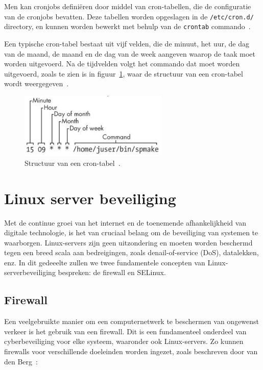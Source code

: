 Men kan cronjobs defini\"eren door middel van cron-tabellen, die de configuratie van de cronjobs bevatten.
Deze tabellen worden opgeslagen in de \texttt{/etc/cron.d/} directory, en kunnen worden bewerkt met behulp van de \texttt{crontab} commando~\autocite{ward2021linux}.

Een typische cron-tabel bestaat uit vijf velden, die de minuut, het uur, de dag van de maand, de maand en de dag van de week aangeven waarop de taak moet worden uitgevoerd.
Na de tijdvelden volgt het commando dat moet worden uitgevoerd, zoals te zien is in figuur~\ref{fig:cronjob-structure}, waar de structuur van een cron-tabel wordt weergegeven~\autocite{ward2021linux}.

\begin{figure}[h!]
    \begin{center}
        \includegraphics[width=200pt]
        {./graphics/linux/cronjob-structure.png}
        \caption{\label{fig:cronjob-structure}Structuur van een cron-tabel~\autocite{ward2021linux}.}
    \end{center}
\end{figure}

\section{Linux server beveiliging}
\label{linux_server_beveiliging}

Met de continue groei van het internet en de toenemende afhankelijkheid van digitale technologie, is het van cruciaal belang om de beveiliging van systemen te waarborgen.
Linux-servers zijn geen uitzondering en moeten worden beschermd tegen een breed scala aan bedreigingen, zoals denail-of-service (DoS), datalekken, enz.
In dit gedeeelte zullen we twee fundamentele concepten van Linux-serverbeveiliging bespreken: de firewall en SELinux.

\subsection{Firewall}
\label{linux_firewall}

Een veelgebruikte manier om een computernetwerk te beschermen van ongewenst verkeer is het gebruik van een firewall.
Dit is een fundamenteel onderdeel van cyberbeveiliging voor elke systeem, waaronder ook Linux-servers.
Zo kunnen firewalls voor verschillende doeleinden worden ingezet, zoals beschreven door van den Berg~\autocite{vandenberg}:

